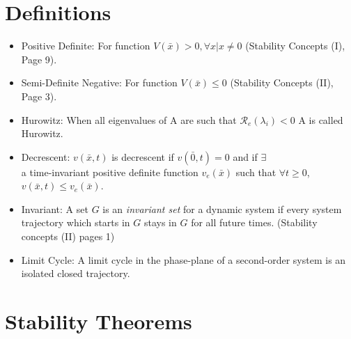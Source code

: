 \documentclass[12pt]{article}
\begin{document}
\section*{Definitions}

\begin{itemize}

\item Positive Definite: For function $V(\bar{x})>0, \forall x | x\neq0$ (Stability Concepts (I), Page 9).

\item Semi-Definite Negative: For function $V(\bar{x})\leq0$ (Stability Concepts (II), Page 3).

\item Hurowitz: When all eigenvalues of A are such that $\mathcal{R}_e(\lambda_i)<0$ A is called Hurowitz. 

\item Decrescent: $v(\bar{x},t)$ is decrescent if $v(\bar{0},t)=0$ and if $\exists$ \\ a time-invariant positive definite function $v_e(\bar{x})$ such that $\forall t\geq0$, $v(\bar{x},t)\leq v_e(\bar{x})$.

\item Invariant: A set $G$ is an {\em invariant set} for a dynamic system if every system trajectory which starts in $G$ stays in $G$ for all future times. (Stability concepts (II) pages 1)

\item Limit Cycle: A limit cycle in the phase-plane of a second-order system is an isolated closed trajectory. 
\end{itemize}


\newpage
\section*{Stability Theorems}
\end{document}
